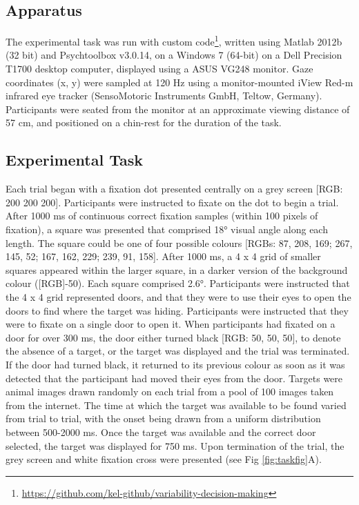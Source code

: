 \documentclass{article}
\begin{document}
\hypertarget{apparatus}{%
\subsection{Apparatus}\label{apparatus}}

The experimental task was run with custom code\footnote{\url{https://github.com/kel-github/variability-decision-making}},
written using Matlab 2012b (32 bit) and Psychtoolbox v3.0.14, on a
Windows 7 (64-bit) on a Dell Precision T1700 desktop computer, displayed
using a ASUS VG248 monitor. Gaze coordinates (x, y) were sampled at 120
Hz using a monitor-mounted iView Red-m infrared eye tracker
(SensoMotoric Instruments GmbH, Teltow, Germany). Participants were
seated from the monitor at an approximate viewing distance of 57 cm, and
positioned on a chin-rest for the duration of the task.

\hypertarget{experimental-task}{%
\subsection{Experimental Task}\label{experimental-task}}

Each trial began with a fixation dot presented centrally on a grey
screen {[}RGB: 200 200 200{]}. Participants were instructed to fixate on
the dot to begin a trial. After 1000 ms of continuous correct fixation
samples (within 100 pixels of fixation), a square was presented that
comprised 18° visual angle along each length. The square could be one of
four possible colours {[}RGBs: 87, 208, 169; 267, 145, 52; 167, 162,
229; 239, 91, 158{]}. After 1000 ms, a 4 x 4 grid of smaller squares
appeared within the larger square, in a darker version of the background
colour ({[}RGB{]}-50). Each square comprised 2.6°. Participants were
instructed that the 4 x 4 grid represented doors, and that they were to
use their eyes to open the doors to find where the target was hiding.
Participants were instructed that they were to fixate on a single door
to open it. When participants had fixated on a door for over 300 ms, the
door either turned black {[}RGB: 50, 50, 50{]}, to denote the absence of
a target, or the target was displayed and the trial was terminated. If
the door had turned black, it returned to its previous colour as soon as
it was detected that the participant had moved their eyes from the door.
Targets were animal images drawn randomly on each trial from a pool of
100 images taken from the internet. The time at which the target was
available to be found varied from trial to trial, with the onset being
drawn from a uniform distribution between 500-2000 ms. Once the target
was available and the correct door selected, the target was displayed
for 750 ms. Upon termination of the trial, the grey screen and white
fixation cross were presented (see Fig \ref{fig:taskfig}A).
\end{document}
